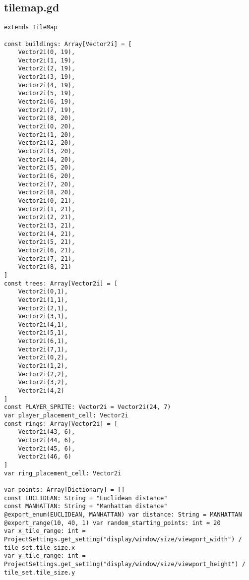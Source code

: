 \subsection{tile\textunderscore{}map.gd}

\begin{lstlisting}
extends TileMap

const buildings: Array[Vector2i] = [
	Vector2i(0, 19),
	Vector2i(1, 19),
	Vector2i(2, 19),
	Vector2i(3, 19),
	Vector2i(4, 19),
	Vector2i(5, 19),
	Vector2i(6, 19),
	Vector2i(7, 19),
	Vector2i(8, 20),
	Vector2i(0, 20),
	Vector2i(1, 20),
	Vector2i(2, 20),
	Vector2i(3, 20),
	Vector2i(4, 20),
	Vector2i(5, 20),
	Vector2i(6, 20),
	Vector2i(7, 20),
	Vector2i(8, 20),
	Vector2i(0, 21),
	Vector2i(1, 21),
	Vector2i(2, 21),
	Vector2i(3, 21),
	Vector2i(4, 21),
	Vector2i(5, 21),
	Vector2i(6, 21),
	Vector2i(7, 21),
	Vector2i(8, 21)
]
const trees: Array[Vector2i] = [
	Vector2i(0,1),
	Vector2i(1,1),
	Vector2i(2,1),
	Vector2i(3,1),
	Vector2i(4,1),
	Vector2i(5,1),
	Vector2i(6,1),
	Vector2i(7,1),
	Vector2i(0,2),
	Vector2i(1,2),
	Vector2i(2,2),
	Vector2i(3,2),
	Vector2i(4,2)
]
const PLAYER_SPRITE: Vector2i = Vector2i(24, 7)
var player_placement_cell: Vector2i
const rings: Array[Vector2i] = [
	Vector2i(43, 6),
	Vector2i(44, 6),
	Vector2i(45, 6),
	Vector2i(46, 6)
]
var ring_placement_cell: Vector2i

var points: Array[Dictionary] = []
const EUCLIDEAN: String = "Euclidean distance"
const MANHATTAN: String = "Manhattan distance"
@export_enum(EUCLIDEAN, MANHATTAN) var distance: String = MANHATTAN
@export_range(10, 40, 1) var random_starting_points: int = 20
var x_tile_range: int = ProjectSettings.get_setting("display/window/size/viewport_width") / tile_set.tile_size.x
var y_tile_range: int = ProjectSettings.get_setting("display/window/size/viewport_height") / tile_set.tile_size.y


\end{lstlisting}
